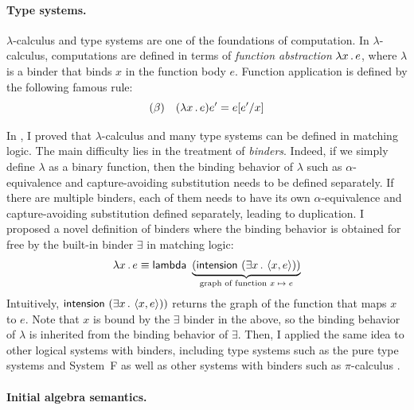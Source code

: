 \documentclass[11pt]{article}
\begin{document}
\paragraph{Type systems.}

$\lambda$-calculus \cite{Chu41} and type systems are one of the foundations of 
computation.
In $\lambda$-calculus, computations are defined in terms of \emph{function 
abstraction} $\lambda x \,.\, e$, where $\lambda$ is a binder that binds $x$ in 
the function body $e$. 
Function application is defined by the following famous \BETA rule:
$$
(\textsc{$\beta$}) \quad (\lambda x \,.\, e) e' = e[e'/x]
$$

In \cite{CR20}, I proved that $\lambda$-calculus and many type systems
can be defined in matching logic. 
The main difficulty lies in the treatment of \emph{binders}. 
Indeed, if we simply define $\lambda$ as a binary function, then the binding 
behavior of $\lambda$ such as $\alpha$-equivalence and capture-avoiding 
substitution needs to be defined separately. 
If there are multiple binders, each of them 
needs to have its own $\alpha$-equivalence 
and capture-avoiding substitution defined separately, leading to duplication. 
I proposed a novel definition of binders where the binding behavior 
is obtained for free by the built-in binder $\exists$ in matching logic:
$$
\lambda x \,.\, e \equiv \mathsf{lambda} \ \underbrace{(\mathsf{intension} \ (\exists x \,.\, 
\left\langle x,e\right\rangle))}_{\text{graph of function $x \mapsto e$}}
$$
Intuitively, $\mathsf{intension} \ (\exists x \,.\, \left\langle x,e\right\rangle))$ returns the graph
of the function that maps $x$ to $e$. 
Note that $x$ is bound by the $\exists$ binder in the above, so the binding 
behavior of $\lambda$ is inherited from the binding behavior of $\exists$. 
Then, I applied the same idea to other logical systems with binders,
including type systems such as the pure type systems \cite{MP93,vBJut93,Bar93} 
and System~F \cite{Gir86,CMMS94} as well as other systems with binders such as 
$\pi$-calculus \cite{MPW92}. 

\paragraph{Initial algebra semantics.}
\end{document}
